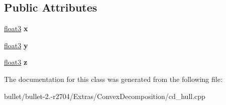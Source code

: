 \subsection*{Public Attributes}
\begin{DoxyCompactItemize}
\item 
\hypertarget{class_convex_decomposition_1_1float3x3_a4970b4629f13a821e983a7b9b44ab9c9}{\hyperlink{class_convex_decomposition_1_1float3}{float3} {\bfseries x}}\label{class_convex_decomposition_1_1float3x3_a4970b4629f13a821e983a7b9b44ab9c9}

\item 
\hypertarget{class_convex_decomposition_1_1float3x3_a8f07982abc50a1c1ea8f403a5e517e3a}{\hyperlink{class_convex_decomposition_1_1float3}{float3} {\bfseries y}}\label{class_convex_decomposition_1_1float3x3_a8f07982abc50a1c1ea8f403a5e517e3a}

\item 
\hypertarget{class_convex_decomposition_1_1float3x3_a86adb222c1b77df9d29adce6beef7750}{\hyperlink{class_convex_decomposition_1_1float3}{float3} {\bfseries z}}\label{class_convex_decomposition_1_1float3x3_a86adb222c1b77df9d29adce6beef7750}

\end{DoxyCompactItemize}


The documentation for this class was generated from the following file\+:\begin{DoxyCompactItemize}
\item 
bullet/bullet-\/2.-\/r2704/\+Extras/\+Convex\+Decomposition/cd\+\_\+hull.\+cpp\end{DoxyCompactItemize}
